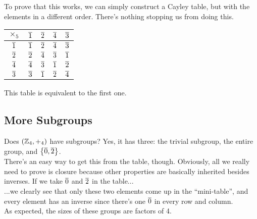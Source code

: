 To prove that this works, we can simply construct a Cayley table, but with
the elements in a different order. There's nothing stopping us from doing
this.
\begin{center}
    \begin{tabular}{|c|c|c|c|c|}
        \hline 
        $\times_5$ & $\overline{1}$ & $\overline{2}$ & $\overline{4}$ & $\overline{3}$ \\ \hline 
        $\overline{1}$ & $\overline{1}$ & $\overline{2}$ & $\overline{4}$ & $\overline{3}$ \\ \hline 
        $\overline{2}$ & $\overline{2}$ & $\overline{4}$ & $\overline{3}$ & $\overline{1}$ \\ \hline 
        $\overline{4}$ & $\overline{4}$ & $\overline{3}$ & $\overline{1}$ & $\overline{2}$ \\ \hline 
        $\overline{3}$ & $\overline{3}$ & $\overline{1}$ & $\overline{2}$ & $\overline{4}$ \\ \hline 
    \end{tabular}
\end{center}
This table is equivalent to the ﬁrst one.

\subsection{More Subgroups}
Does $(\mathbb{Z}_4, +_4)$ have subgroups? Yes, it has three: the trivial subgroup, the
entire group, and $\left\{\overline{0}, \overline{2}\right\}$. \\

There's an easy way to get this from the table, though. Obviously, all we really
need to prove is closure because other properties are basically inherited
besides inverses. If we take $\overline{0}$ and $\overline{2}$ in the table...\\

...we clearly see that only these two elements come up in the ``mini-table'',
and every element has an inverse since there's one $\overline{0}$ in every row and column. \\

As expected, the sizes of these groups are factors of 4.

